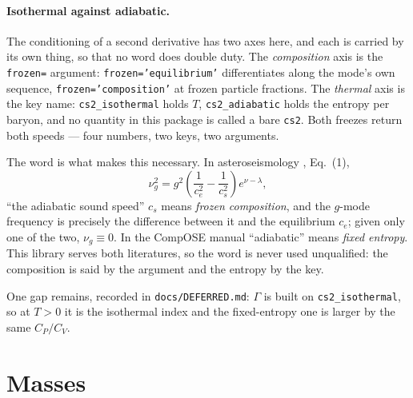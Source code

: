 \documentclass[aps,prc,onecolumn,superscriptaddress,nofootinbib,10pt]{revtex4-2}
\begin{document}
\paragraph{Isothermal against adiabatic.} The conditioning of a second
derivative has two axes here, and each is carried by its own thing, so that no
word does double duty. The \emph{composition} axis is the \texttt{frozen=}
argument: \texttt{frozen='equilibrium'} differentiates along the mode's own
sequence, \texttt{frozen='composition'} at frozen particle fractions. The
\emph{thermal} axis is the key name: \texttt{cs2\_isothermal} holds $T$,
\texttt{cs2\_adiabatic} holds the entropy per baryon, and no quantity in this
package is called a bare \texttt{cs2}. Both freezes return both speeds --- four
numbers, two keys, two arguments.

The word is what makes this necessary. In asteroseismology \cite{ZhaoLattimer2022},
Eq.~(1),
%
\begin{equation}
  \nu_g^2 = g^2 \left( \frac{1}{c_e^2} - \frac{1}{c_s^2} \right)
            e^{\nu - \lambda} ,
\end{equation}
%
``the adiabatic sound speed'' $c_s$ means \emph{frozen composition}, and the
$g$-mode frequency is precisely the difference between it and the equilibrium
$c_e$; given only one of the two, $\nu_g \equiv 0$. In the CompOSE manual
\cite{TypelCompOSE2015} ``adiabatic'' means \emph{fixed entropy}. This library serves
both literatures, so the word is never used unqualified: the composition is
said by the argument and the entropy by the key.

One gap remains, recorded in \texttt{docs/DEFERRED.md}: $\Gamma$ is built on
\texttt{cs2\_isothermal}, so at $T > 0$ it is the isothermal index and the
fixed-entropy one is larger by the same $C_P/C_V$.

\section{Masses}
\label{sec:masses}
\end{document}
